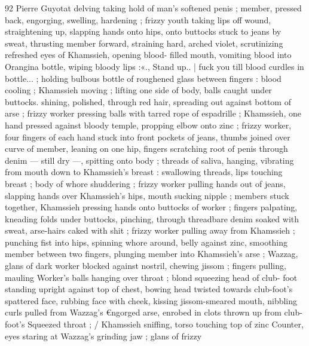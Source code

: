 92 Pierre Guyotat
delving taking hold of man's softened penis ; member, pressed back,
engorging, swelling, hardening ; frizzy youth taking lips off wound,
straightening up, slapping hands onto hips, onto buttocks stuck to
jeans by sweat, thrusting member forward, straining hard, arched
violet, scrutinizing refreshed eyes of Khamssieh, opening blood-
filled mouth, vomiting blood into Orangina bottle, wiping bloody lips
:«., Stand up.. | fuck you till blood curdles in bottle... ; holding
bulbous bottle of roughened glass between fingers : blood cooling ;
Khamssieh moving ; lifting one side of body, balls caught under
buttocks. shining, polished, through red hair, spreading out against
bottom of arse ; frizzy worker pressing balls with tarred rope of
espadrille ; Khamssieh, one hand pressed against bloody temple,
propping elbow onto zinc ; frizzy worker, four fingers of each hand
stuck into front pockets of jeans, thumbs joined over curve of
member, leaning on one hip, fingers scratching root of penis through
denim — still dry —, spitting onto body ; threads of saliva, hanging,
vibrating from mouth down to Khamssieh's breast : swallowing
threads, lips touching breast ; body of whore shuddering ; frizzy
worker pulling hands out of jeans, slapping hands over Khamssieh's
hips, mouth sucking nipple ; members stuck together, Khamssieh
pressing hands onto buttocks of worker ; fingers palpating, kneading
folds under buttocks, pinching, through threadbare denim soaked
with sweat, arse-hairs caked with shit ; frizzy worker pulling away
from Khamssieh ; punching fist into hips, spinning whore around,
belly against zinc, smoothing member between two fingers, plunging
member into Khamssieh's arse ; Wazzag, glans of dark worker
blocked against nostril, chewing jissom ; fingers pulling, mauling
Worker's balls hanging over throat ; blond squeezing head of club-
foot standing upright against top of chest, bowing head twisted
towards club-foot’s spattered face, rubbing face with cheek, kissing
jissom-smeared mouth, nibbling curls pulled from Wazzag's
€ngorged arse, enrobed in clots thrown up from club-foot's
Squeezed throat ; / Khamssieh sniffing, torso touching top of zinc
Counter, eyes staring at Wazzag's grinding jaw ; glans of frizzy

